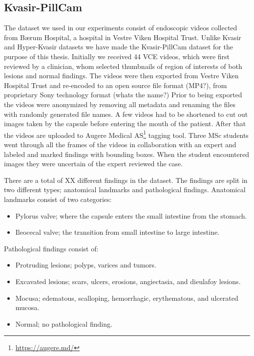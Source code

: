 \documentclass[thesis.tex]{subfiles}
\begin{document}
\subsection{Kvasir-PillCam} \label{sec:kvasir_pillcam}
The dataset we used in our experiments consist of endoscopic videos collected from Bærum Hospital, a hospital in Vestre Viken Hospital Trust. Unlike Kvasir and Hyper-Kvasir datasets we have made the Kvasir-PillCam dataset for the purpose of this thesis. Initially we received 44 VCE videos, which were first reviewed by a clinician, whom selected thumbnails of region of interests of both lesions and normal findings. The videos were then exported from Vestre Viken Hospital Trust and re-encoded to an open source file format (MP4?), from proprietary Sony technology format (whats the name?) %
Prior to being exported the videos were anonymized by removing all metadata and renaming the files with randomly generated file names. A few videos had to be shortened to cut out images taken by the capsule before entering the mouth of the patient. After that the videos are uploaded to Augere Medical AS\footnote{\url{https://augere.md/}} tagging tool. Three MSc students went through all the frames of the videos in collaboration with an expert and labeled and marked findings with bounding boxes. When the student encountered images they were uncertain of the expert reviewed the case.

There are a total of XX different findings in the dataset. The findings are split in two different types; anatomical landmarks and pathological findings. Anatomical landmarks consist of two categories:
\begin{itemize}
\item Pylorus valve; where the capsule enters the small intestine from the stomach.
\item Ileocecal valve; the transition from small intestine to large intestine. 
\end{itemize}

Pathological findings consist of:
\begin{itemize}
\item Protruding lesions; polyps, varices and tumors.
\item Excavated lesions; scars, ulcers, erosions, angiectasia, and dieulafoy lesions.
\item Mocusa; edematous, scalloping, hemorrhagic, erythematous, and ulcerated mucosa.
\item Normal; no pathological finding.
\end{itemize}
\end{document}
